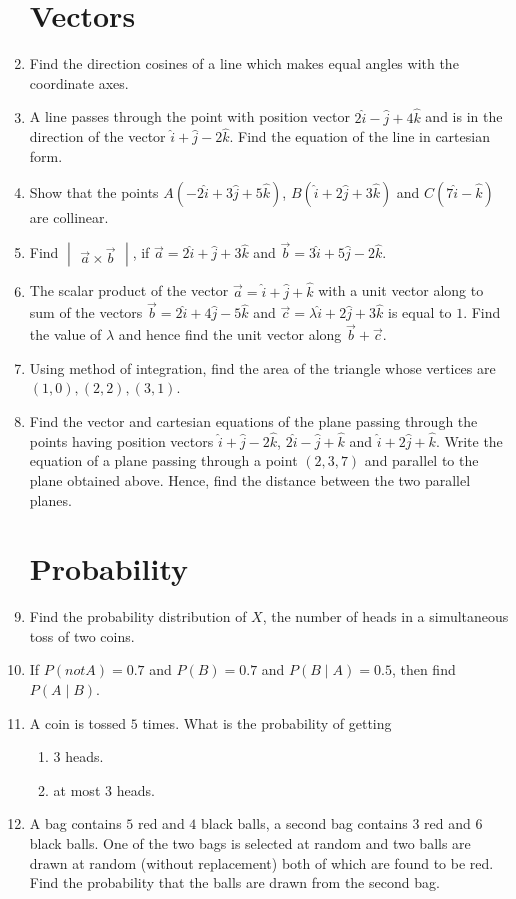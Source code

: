 \documentclass[2pt,-letter paper]{article}
\providecommand{\mydet}[1]{\ensuremath{\begin{vmatrix}#1\end{vmatrix}}}
\providecommand{\brak}[1]{\ensuremath{\left(#1\right)}}
\begin{document}
\begin{enumerate}
\section{Vectors}
\item Find the direction cosines of a line which makes equal angles with the coordinate axes.
\item A line passes through the point with position vector $2\hat{i}-\hat{j}+4\hat{k}$ and is in the direction of the vector $\hat{i}+\hat{j}-2\hat{k}$. Find the equation of the line in cartesian form.
\item Show that the points $A(-2\hat{i}+3\hat{j}+5\hat{k})$, $B(\hat{i}+2\hat{j}+3\hat{k})$ and $C(7\hat{i}-\hat{k})$ are collinear.
\item Find $\mydet{\overrightarrow{a}\times \overrightarrow{b}}$, if $\overrightarrow{a}=2\hat{i}+\hat{j}+3\hat{k}$ and $\overrightarrow{b}=3\hat{i}+5\hat{j}-2\hat{k}$.
\item The scalar product of the vector $\overrightarrow{a}=\hat{i}+\hat{j}+\hat{k}$ with a unit vector along to sum of the vectors $\overrightarrow{b}=2\hat{i}+4\hat{j}-5\hat{k}$ and $\overrightarrow{c}=\lambda\hat{i}+2\hat{j}+3\hat{k}$ is equal to $1$. Find the value of $\lambda$ and hence find the unit vector along $\overrightarrow{b} + \overrightarrow{c}$.
\item Using method of integration, find the area of the triangle whose vertices are $\brak{1,0}, \brak{2,2}, \brak{3,1}$.
	\item Find the vector and cartesian equations of the plane passing through the points having position vectors $\hat{i} + \hat{j} - 2\hat{k}$, $2\hat{i} - \hat{j} + \hat{k}$ and $\hat{i} + 2\hat{j} + \hat{k}$. Write the equation of a plane passing through a point $\brak{2,3,7}$ and parallel to the plane obtained above. Hence, find the distance between the two parallel planes.

\section{Probability}
\item Find the probability distribution of $X$, the number of  heads in a simultaneous toss of two coins.
\item If $P(not A)=0.7$ and $P(B) = 0.7$ and $P(B\mid A) = 0.5$, then find $P(A\mid B)$.
\item A coin is tossed $5$ times. What is the probability of getting
	\begin{enumerate}
	\item $3$ heads.
	\item at most $3$ heads.
        \end{enumerate}
\item A bag contains $5$ red and $4$ black balls, a second bag contains $3$ red and $6$ black balls. One of the two bags is selected at random and two balls are drawn at random (without replacement) both of which are found to be red. Find the probability that the balls are drawn from the second bag.

\end{enumerate}
\end{document}
